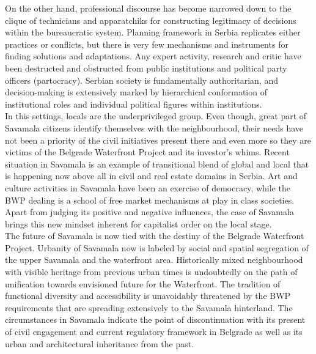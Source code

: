 \documentclass[11pt]{report}
\begin{document}
{On the other hand, professional discourse has become narrowed down to the clique of technicians and apparatchiks for constructing legitimacy of decisions within the bureaucratic system. 
Planning framework in Serbia replicates either practices or conflicts, but there is very few mechanisms and instruments for finding solutions and adaptations.
Any expert activity, research and critic have been destructed and obstructed from public institutions and political party officers (partocracy).
Serbian society is fundamentally authoritarian, and decision-making is extensively marked by hierarchical conformation of institutional roles and individual political figures within institutions.
\\

In this settings, locals are the underprivileged group.
Even though, great part of Savamala citizens identify themselves with the neighbourhood, their needs have not been a priority of the civil initiatives  present there and even more so they are victims of the Belgrade Waterfront Project and its investor's whims.
Recent situation in Savamala is an example of transitional blend of global and local that is happening now above all in civil and real estate domains in Serbia.
Art and culture activities in Savamala have been an exercise of democracy, while the BWP dealing is a school of free market mechanisms at play in class societies.
Apart from judging its positive and negative influences, the case of Savamala brings this new mindset inherent for capitalist order on the local stage.
\\

The future of Savamala is now tied with the destiny of the Belgrade Waterfront Project.
Urbanity of Savamala now is labeled by social and spatial segregation of the upper Savamala and the waterfront area.
Historically mixed neighbourhood with visible heritage from previous urban times is undoubtedly on the path of unification towards envisioned future for the Waterfront.
The tradition of functional diversity and accessibility is unavoidably threatened by the BWP requirements that are spreading extensively to the Savamala hinterland.
The circumstances in Savamala indicate the point of discontinuation with its present of civil engagement and current regulatory framework in Belgrade as well as its urban and architectural inheritance from the past.
\\

}
\end{document}
